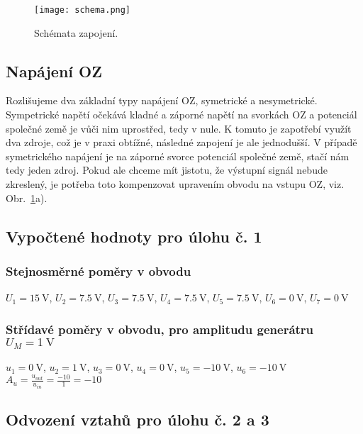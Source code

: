 \begin{figure}[h!]
    \centering
    \texttt{[image: schema.png]}
    \centering
    \caption{Schémata zapojení.}
    \label{fig:schema}
\end{figure}



\subsection{Napájení OZ}

    Rozlišujeme dva základní typy napájení OZ, symetrické a nesymetrické. Sympetrické napětí očekává kladné a záporné napětí na svorkách OZ a potenciál společné země je vůči nim uprostřed, tedy v nule. K tomuto je zapotřebí využít dva zdroje, což je v praxi obtížné, následné zapojení je ale jednodušší. V případě symetrického napájení je na záporné svorce potenciál společné země, stačí nám tedy jeden zdroj. Pokud ale chceme mít jistotu, že výstupní signál nebude zkreslený, je potřeba toto kompenzovat upravením obvodu na vstupu OZ, viz. Obr.~\ref{fig:schema}a).


\subsection{Vypočtené hodnoty pro úlohu č. 1}
    \subsubsection{Stejnosměrné poměry v obvodu}
        $ U_1=\qty{15}{\volt} $, $ U_2=\qty{7.5}{\volt} $, $ U_3=\qty{7.5}{\volt} $, $ U_4=\qty{7.5}{\volt} $, $ U_5=\qty{7.5}{\volt} $, $ U_6=\qty{0}{\volt} $, $ U_7=\qty{0}{\volt} $


    \subsubsection{Střídavé poměry v obvodu, pro amplitudu generátru $ U_M=\qty{1}{\volt} $ }
        $ u_1=\qty{0}{\volt} $, 
        $ u_2=\qty{1}{\volt} $, 
        $ u_3=\qty{0}{\volt} $, 
        $ u_4=\qty{0}{\volt} $, 
        $ u_5=\qty{-10}{\volt} $, 
        $ u_6=\qty{-10}{\volt} $\\
        $ A_u=\frac{u_{out}}{u_{in}}=\frac{-10}{1}=-10 $

\subsection{Odvození vztahů pro úlohu č. 2 a 3}
